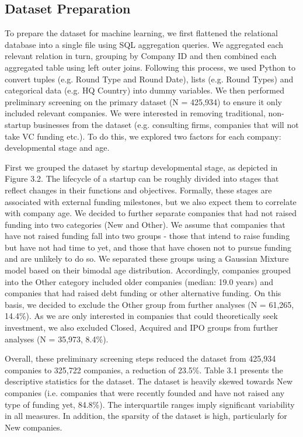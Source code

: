 \documentclass[../thesis/thesis.tex]{subfiles}
\begin{document}
\subsection{Dataset Preparation}

To prepare the dataset for machine learning, we first flattened the relational database into a single file using SQL aggregation queries. We aggregated each relevant relation in turn, grouping by Company ID and then combined each aggregated table using left outer joins. Following this process, we used Python to convert tuples (e.g. Round Type and Round Date), lists (e.g. Round Types) and categorical data (e.g. HQ Country) into dummy variables. We then performed preliminary screening on the primary dataset (N = 425,934) to ensure it only included relevant companies. We were interested in removing traditional, non-startup businesses from the dataset (e.g. consulting firms, companies that will not take VC funding etc.). To do this, we explored two factors for each company: developmental stage and age.

First we grouped the dataset by startup developmental stage, as depicted in Figure 3.2. The lifecycle of a startup can be roughly divided into stages that reflect changes in their functions and objectives. Formally, these stages are associated with external funding milestones, but we also expect them to correlate with company age. We decided to further separate companies that had not raised funding into two categories (New and Other). We assume that companies that have not raised funding fall into two groups - those that intend to raise funding but have not had time to yet, and those that have chosen not to pursue funding and are unlikely to do so. We separated these groups using a Gaussian Mixture model based on their bimodal age distribution. Accordingly, companies grouped into the Other category included older companies (median: 19.0 years) and companies that had raised debt funding or other alternative funding. On this basis, we decided to exclude the Other group from further analyses (N = 61,265, 14.4\%). As we are only interested in companies that could theoretically seek investment, we also excluded Closed, Acquired and IPO groups from further analyses (N = 35,973, 8.4\%).

Overall, these preliminary screening steps reduced the dataset from 425,934 companies to 325,722 companies, a reduction of 23.5\%. Table 3.1 presents the descriptive statistics for the dataset. The dataset is heavily skewed towards New companies (i.e. companies that were recently founded and have not raised any type of funding yet, 84.8\%). The interquartile ranges imply significant variability in all measures. In addition, the sparsity of the dataset is high, particularly for New companies.
\end{document}
